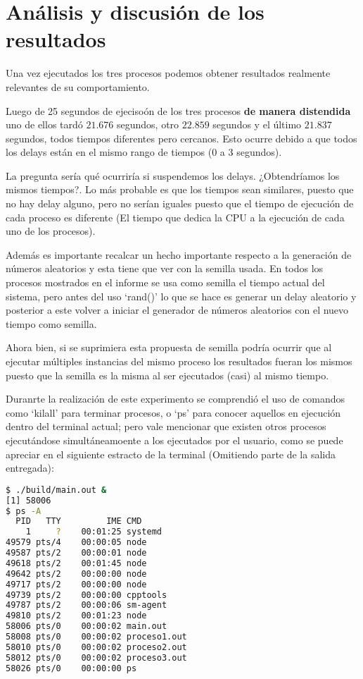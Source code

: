 \section{Análisis y discusión de los resultados}

Una vez ejecutados los tres procesos podemos obtener resultados realmente relevantes de su comportamiento.

Luego de 25 segundos de ejecisoón de los tres procesos \textbf{de manera distendida} uno de ellos tardó $21.676$ segundos, otro $22.859$ segundos y el último $21.837$ segundos, todos tiempos diferentes pero cercanos. Esto ocurre debido a que todos los delays están en el mismo rango de tiempos (0 a 3 segundos).

La pregunta sería qué ocurriría si suspendemos los delays. ¿Obtendríamos los mismos tiempos?. Lo más probable es que los tiempos sean similares, puesto que no hay delay alguno, pero no serían iguales puesto que el tiempo de ejecución de cada proceso es diferente (El tiempo que dedica la CPU a la ejecución de cada uno de los procesos).

Además es importante recalcar un hecho importante respecto a la generación de números aleatorios y esta tiene que ver con la semilla usada. En todos los procesos mostrados en el informe se usa como semilla el tiempo actual del sistema, pero antes del uso `rand()' lo que se hace es generar un delay aleatorio y posterior a este volver a iniciar el generador de números aleatorios con el nuevo tiempo como semilla.

Ahora bien, si se suprimiera esta propuesta de semilla podría ocurrir que al ejecutar múltiples instancias del mismo proceso los resultados fueran los mismos puesto que la semilla es la misma al ser ejecutados (casi) al mismo tiempo.

Duranrte la realización de este experimento se comprendió el uso de comandos como `kilall' para terminar procesos, o `ps' para conocer aquellos en ejecución dentro del terminal actual; pero vale mencionar que existen otros procesos ejecutándose simultáneamoente a los ejecutados por el usuario, como se puede apreciar en el siguiente estracto de la terminal (Omitiendo parte de la salida entregada):


\begin{lstlisting}[style=CodeStyle, language=bash]
$ ./build/main.out &
[1] 58006
$ ps -A
  PID   TTY         IME CMD
    1     ?    00:01:25 systemd
49579 pts/4    00:00:05 node
49587 pts/2    00:00:01 node
49618 pts/2    00:01:45 node
49642 pts/2    00:00:00 node
49717 pts/2    00:00:00 node
49739 pts/2    00:00:00 cpptools
49787 pts/2    00:00:06 sm-agent
49810 pts/2    00:01:23 node
58006 pts/0    00:00:02 main.out
58008 pts/0    00:00:02 proceso1.out
58010 pts/0    00:00:02 proceso2.out
58012 pts/0    00:00:02 proceso3.out
58026 pts/0    00:00:00 ps
\end{lstlisting}

